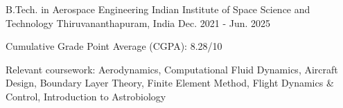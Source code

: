 

\begin{cventries}

  \cventry
  {B.Tech. in Aerospace Engineering} %
  {Indian Institute of Space Science and Technology} %
  {Thiruvananthapuram, India} %
  {Dec. 2021 - Jun. 2025} %
  {
    \begin{cvitems} %
      \item {Cumulative Grade Point Average (CGPA): 8.28/10}
      \item {Relevant coursework: Aerodynamics, Computational Fluid Dynamics, Aircraft Design, Boundary Layer Theory, Finite Element Method, Flight Dynamics \& Control, Introduction to Astrobiology}
    \end{cvitems}
  }


\end{cventries}
